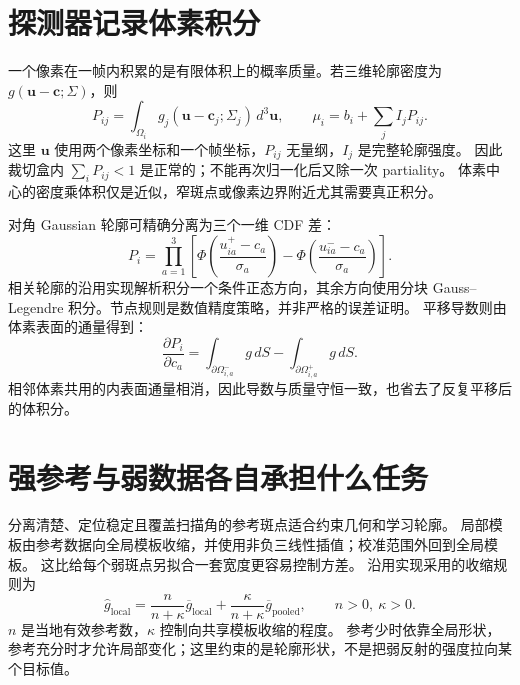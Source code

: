 \section{探测器记录体素积分}

一个像素在一帧内积累的是有限体积上的概率质量。若三维轮廓密度为
$g(\bm u-\bm c;\Sigma)$，则
\begin{equation}
 P_{ij}=\int_{\Omega_i}g_j(\bm u-\bm c_j;\Sigma_j)\,d^3\bm u,
 \qquad \mu_i=b_i+\sum_j I_jP_{ij}.
 \label{eq:geometry-voxel}
\end{equation}
这里 $\bm u$ 使用两个像素坐标和一个帧坐标，$P_{ij}$ 无量纲，$I_j$ 是完整轮廓强度。
因此裁切盒内 $\sum_iP_{ij}<1$ 是正常的；不能再次归一化后又除一次 partiality。
体素中心的密度乘体积仅是近似，窄斑点或像素边界附近尤其需要真正积分。

对角 Gaussian 轮廓可精确分离为三个一维 CDF 差：
\begin{equation}
 P_i=\prod_{a=1}^{3}\left[
 \Phi\!\left(\frac{u_{ia}^{+}-c_a}{\sigma_a}\right)
 -\Phi\!\left(\frac{u_{ia}^{-}-c_a}{\sigma_a}\right)\right].
 \label{eq:geometry-cdf}
\end{equation}
相关轮廓的沿用实现解析积分一个条件正态方向，其余方向使用分块
Gauss--Legendre 积分。节点规则是数值精度策略，并非严格的误差证明。
平移导数则由体素表面的通量得到：
\begin{equation}
 \frac{\partial P_i}{\partial c_a}
 =\int_{\partial\Omega_{i,a}^{-}}g\,dS
  -\int_{\partial\Omega_{i,a}^{+}}g\,dS.
 \label{eq:geometry-face-flux}
\end{equation}
相邻体素共用的内表面通量相消，因此导数与质量守恒一致，也省去了反复平移后的体积分。

\section{强参考与弱数据各自承担什么任务}

分离清楚、定位稳定且覆盖扫描角的参考斑点适合约束几何和学习轮廓。
局部模板由参考数据向全局模板收缩，并使用非负三线性插值；校准范围外回到全局模板。
这比给每个弱斑点另拟合一套宽度更容易控制方差。
沿用实现采用的收缩规则为
\begin{equation}
 \widehat g_{\mathrm{local}}=
 \frac{n}{n+\kappa}\overline g_{\mathrm{local}}
 +\frac{\kappa}{n+\kappa}\overline g_{\mathrm{pooled}},
 \qquad n>0,\ \kappa>0.
 \label{eq:geometry-profile-shrinkage}
\end{equation}
$n$ 是当地有效参考数，$\kappa$ 控制向共享模板收缩的程度。
参考少时依靠全局形状，参考充分时才允许局部变化；这里约束的是轮廓形状，不是把弱反射的强度拉向某个目标值。

